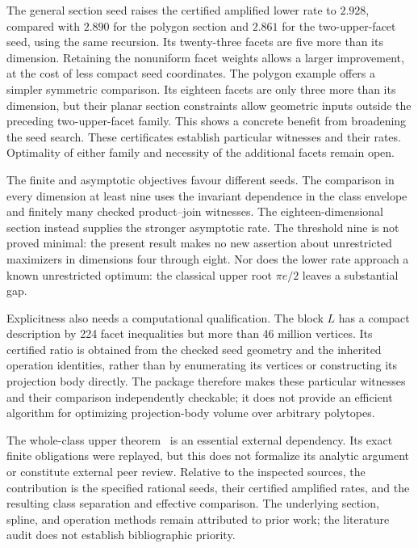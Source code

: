 \documentclass[11pt]{article}
\begin{document}
The general section seed raises the certified amplified lower rate to
$2.928$, compared with $2.890$ for the polygon section and $2.861$ for
the two-upper-facet seed, using the same recursion. Its twenty-three
facets are five more than its dimension. Retaining the nonuniform facet
weights allows a larger improvement, at the cost of less compact seed
coordinates. The polygon example offers a simpler symmetric comparison. Its eighteen facets are only three more than its dimension, but their planar section
constraints allow geometric inputs outside the preceding two-upper-facet
family. This shows a concrete benefit from broadening the seed search.
These certificates establish particular witnesses and their rates.
Optimality of either family and necessity of the additional facets remain open.

The finite and asymptotic objectives favour different seeds. The comparison
in every dimension at least nine uses the invariant dependence in the
class envelope and finitely many checked product--join witnesses. The
eighteen-dimensional section instead supplies the stronger asymptotic rate.
The threshold nine is not proved minimal: the present result makes no new
assertion about unrestricted maximizers in dimensions four through eight.
Nor does the lower rate approach a known unrestricted optimum: the
classical upper root $\pi e/2$ leaves a substantial gap.

Explicitness also needs a computational qualification. The block $L$
has a compact description by 224 facet inequalities but more than
46 million vertices. Its certified ratio is obtained from the checked
seed geometry and the inherited operation identities, rather than by
enumerating its vertices or constructing its projection body directly.
The package therefore makes these particular witnesses and their
comparison independently checkable; it does not provide an efficient
algorithm for optimizing projection-body volume over arbitrary polytopes.

The whole-class upper theorem~\cite{mxym-upper} is an essential external
dependency. Its exact finite obligations were replayed, but this does not
formalize its analytic argument or constitute external peer review.
Relative to the inspected sources, the contribution is the specified
rational seeds, their certified amplified rates, and the resulting
class separation and effective comparison. The underlying section,
spline, and operation methods remain attributed to prior work; the
literature audit does not establish bibliographic priority.
\end{document}
